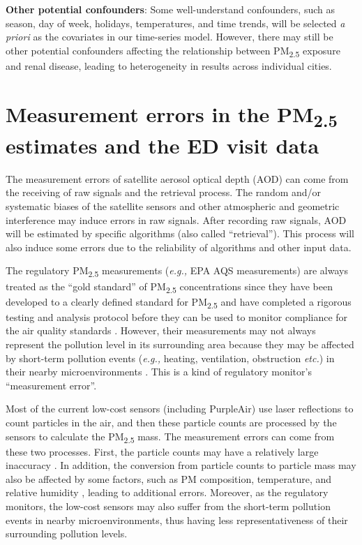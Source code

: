 \documentclass[11pt]{article}
\newcommand{\tsub}{\textsubscript}
\begin{document}
\begin{enumerate*}[{[1)]}]
    \item \textbf{Other potential confounders}: Some well-understand confounders, such as season, day of week, holidays, temperatures, and time trends, will be selected \textit{a priori} as the covariates in our time-series model. However, there may still be other potential confounders affecting the relationship between PM\tsub{2.5} exposure and renal disease, leading to heterogeneity in results across individual cities. 
\end{enumerate*}

\section{Measurement errors in the \texorpdfstring{PM\tsub{2.5}}{PM2.5} estimates and the ED visit data}
\begin{enumerate*}[{[a)]}]
    \item The measurement errors of satellite aerosol optical depth (AOD) can come from the receiving of raw signals and the retrieval process. The random and/or systematic biases of the satellite sensors and other atmospheric and geometric interference may induce errors in raw signals. After recording raw signals, AOD will be estimated by specific algorithms (also called ``retrieval''). This process will also induce some errors due to the reliability of algorithms and other input data. 
    
    The regulatory PM\tsub{2.5} measurements (\textit{e.g.,} EPA AQS measurements) are always treated as the ``gold standard'' of PM\tsub{2.5} concentrations since they have been developed to a clearly defined standard for PM\tsub{2.5} and have completed a rigorous testing and analysis protocol before they can be used to monitor compliance for the air quality standards \citep{hall2014integrating}. However, their measurements may not always represent the pollution level in its surrounding area because they may be affected by short-term pollution events (\textit{e.g.,} heating, ventilation, obstruction \textit{etc.}) in their nearby microenvironments \citep{carvlin2017development}. This is a kind of regulatory monitor's ``measurement error''.
    
    Most of the current low-cost sensors (including PurpleAir) use laser reflections to count particles in the air, and then these particle counts are processed by the sensors to calculate the PM\tsub{2.5} mass. The measurement errors can come from these two processes. First, the particle counts may have a relatively large inaccuracy \citep{northcross2013low}. In addition, the conversion from particle counts to particle mass may also be affected by some factors, such as PM composition, temperature, and relative humidity \citep{ gao2015distributed, carvlin2017development}, leading to additional errors. Moreover, as the regulatory monitors, the low-cost sensors may also suffer from the short-term pollution events in nearby microenvironments, thus having less representativeness of their surrounding pollution levels. 
    

\end{enumerate*}
\end{document}
